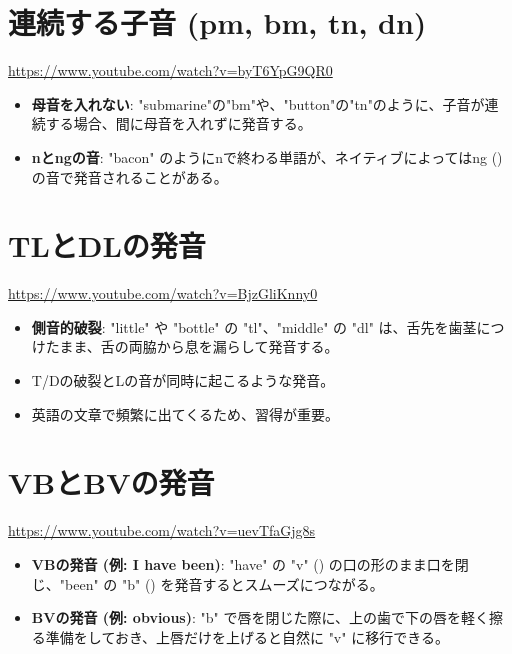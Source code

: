 \documentclass{jlreq}
\begin{document}
\section{連続する子音 (pm, bm, tn, dn)}
\href{https://www.youtube.com/watch?v=byT6YpG9QR0}{https://www.youtube.com/watch?v=byT6YpG9QR0}
\begin{itemize}
    \item \textbf{母音を入れない}: "submarine"の"bm"や、"button"の"tn"のように、子音が連続する場合、間に母音を入れずに発音する。
    \item \textbf{nとngの音}: "bacon" のようにnで終わる単語が、ネイティブによってはng (\textipa{[\ng]}) の音で発音されることがある。
\end{itemize}

\section{TLとDLの発音}
\href{https://www.youtube.com/watch?v=BjzGliKnny0}{https://www.youtube.com/watch?v=BjzGliKnny0}
\begin{itemize}
    \item \textbf{側音的破裂}: "little" や "bottle" の "tl"、"middle" の "dl" は、舌先を歯茎につけたまま、舌の両脇から息を漏らして発音する。
    \item T/Dの破裂とLの音が同時に起こるような発音。
    \item 英語の文章で頻繁に出てくるため、習得が重要。
\end{itemize}

\section{VBとBVの発音}
\href{https://www.youtube.com/watch?v=uevTfaGjg8s}{https://www.youtube.com/watch?v=uevTfaGjg8s}
\begin{itemize}
    \item \textbf{VBの発音 (例: I have been)}: "have" の "v" (\textipa{[v]}) の口の形のまま口を閉じ、"been" の "b" (\textipa{[b]}) を発音するとスムーズにつながる。
    \item \textbf{BVの発音 (例: obvious)}: "b" で唇を閉じた際に、上の歯で下の唇を軽く擦る準備をしておき、上唇だけを上げると自然に "v" に移行できる。
\end{itemize}
\end{document}
